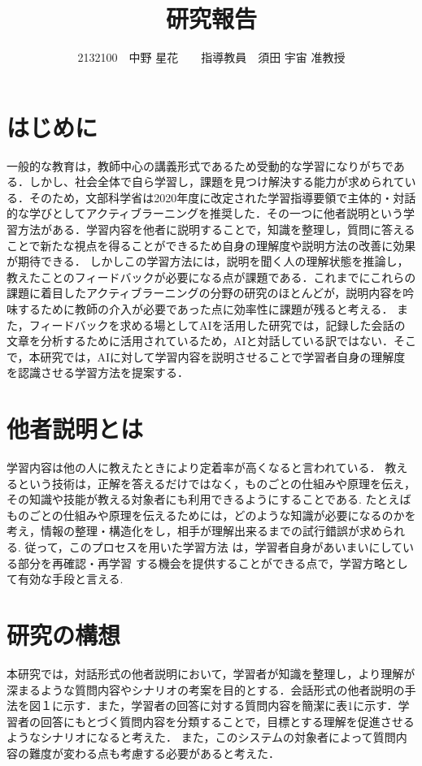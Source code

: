 \documentclass[twocolumn,10pt,a4j]{ltjsarticle}
\title{研究報告}
\author{2132100　中野 星花　　指導教員　須田 宇宙 准教授}
\date{}
\begin{document}
\maketitle

\section{はじめに}
一般的な教育は，教師中心の講義形式であるため受動的な学習になりがちである．しかし、社会全体で自ら学習し，課題を見つけ解決する能力が求められている．そのため，文部科学省は2020年度に改定された学習指導要領で主体的・対話的な学びとしてアクティブラーニングを推奨した．その一つに他者説明という学習方法がある．学習内容を他者に説明することで，知識を整理し，質問に答えることで新たな視点を得ることができるため自身の理解度や説明方法の改善に効果が期待できる．
しかしこの学習方法には，説明を聞く人の理解状態を推論し，教えたことのフィードバックが必要になる点が課題である．これまでにこれらの課題に着目したアクティブラーニングの分野の研究のほとんどが，説明内容を吟味するために教師の介入が必要であった点に効率性に課題が残ると考える．
また，フィードバックを求める場としてAIを活用した研究では，記録した会話の文章を分析するために活用されているため，AIと対話している訳ではない．そこで，本研究では，AIに対して学習内容を説明させることで学習者自身の理解度を認識させる学習方法を提案する．

\section{他者説明とは}
学習内容は他の人に教えたときにより定着率が高くなると言われている．
教えるという技術は，正解を答えるだけではなく，ものごとの仕組みや原理を伝え，その知識や技能が教える対象者にも利用できるようにすることである.
たとえばものごとの仕組みや原理を伝えるためには，どのような知識が必要になるのかを考え，情報の整理・構造化をし，相手が理解出来るまでの試行錯誤が求められる.
従って，このプロセスを用いた学習方法 は，学習者自身があいまいにしている部分を再確認・再学習 する機会を提供することができる点で，学習方略として有効な手段と言える.


\section{研究の構想}
本研究では，対話形式の他者説明において，学習者が知識を整理し，より理解が深まるような質問内容やシナリオの考案を目的とする．会話形式の他者説明の手法を図１に示す．また，学習者の回答に対する質問内容を簡潔に表1に示す．学習者の回答にもとづく質問内容を分類することで，目標とする理解を促進させるようなシナリオになると考えた．
また，このシステムの対象者によって質問内容の難度が変わる点も考慮する必要があると考えた．
\end{document}
